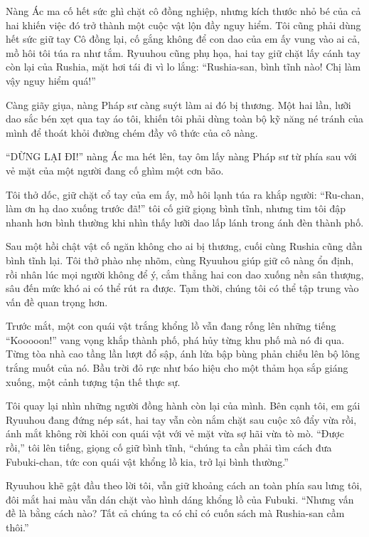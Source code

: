 \documentclass[../main.tex]{subfiles}
\begin{document}
Nàng Ác ma cố hết sức ghì chặt cô đồng nghiệp, nhưng kích thước nhỏ bé của cả hai khiến việc đó trở thành một cuộc vật lộn đầy nguy hiểm. Tôi cũng phải dùng hết sức giữ tay Cô đồng lại, cố gắng không để con dao của em ấy vung vào ai cả, mồ hôi tôi túa ra như tắm. Ryuuhou cũng phụ họa, hai tay giữ chặt lấy cánh tay còn lại của Rushia, mặt hơi tái đi vì lo lắng: ``Rushia-san, bình tĩnh nào! Chị làm vậy nguy hiểm quá!''

Càng giãy giụa, nàng Pháp sư càng suýt làm ai đó bị thương. Một hai lần, lưỡi dao sắc bén xẹt qua tay áo tôi, khiến tôi phải dùng toàn bộ kỹ năng né tránh của mình để thoát khỏi đường chém đầy vô thức của cô nàng.

``DỪNG LẠI ĐI!'' nàng Ác ma hét lên, tay ôm lấy nàng Pháp sư từ phía sau với vẻ mặt của một người đang cố ghìm một cơn bão.

Tôi thở dốc, giữ chặt cổ tay của em ấy, mồ hôi lạnh túa ra khắp người: ``Ru-chan, làm ơn hạ dao xuống trước đã!'' tôi cố giữ giọng bình tĩnh, nhưng tim tôi đập nhanh hơn bình thường khi nhìn thấy lưỡi dao lấp lánh trong ánh đèn thành phố.

\ct

Sau một hồi chật vật cố ngăn không cho ai bị thương, cuối cùng Rushia cũng dần bình tĩnh lại. Tôi thở phào nhẹ nhõm, cùng Ryuuhou giúp giữ cô nàng ổn định, rồi nhân lúc mọi người không để ý, cắm thẳng hai con dao xuống nền sân thượng, sâu đến mức khó ai có thể rút ra được. Tạm thời, chúng tôi có thể tập trung vào vấn đề quan trọng hơn.

Trước mắt, một con quái vật trắng khổng lồ vẫn đang rống lên những tiếng ``Kooooon!'' vang vọng khắp thành phố, phá hủy từng khu phố mà nó đi qua. Từng tòa nhà cao tầng lần lượt đổ sập, ánh lửa bập bùng phản chiếu lên bộ lông trắng muốt của nó. Bầu trời đỏ rực như báo hiệu cho một thảm họa sắp giáng xuống, một cảnh tượng tận thế thực sự.

Tôi quay lại nhìn những người đồng hành còn lại của mình. Bên cạnh tôi, em gái Ryuuhou đang đứng nép sát, hai tay vẫn còn nắm chặt sau cuộc xô đẩy vừa rồi, ánh mắt không rời khỏi con quái vật với vẻ mặt vừa sợ hãi vừa tò mò. ``Được rồi,'' tôi lên tiếng, giọng cố giữ bình tĩnh, ``chúng ta cần phải tìm cách đưa Fubuki-chan, tức con quái vật khổng lồ kia, trở lại bình thường.''

Ryuuhou khẽ gật đầu theo lời tôi, vẫn giữ khoảng cách an toàn phía sau lưng tôi, đôi mắt hai màu vẫn dán chặt vào hình dáng khổng lồ của Fubuki. ``Nhưng vấn đề là bằng cách nào? Tất cả chúng ta có chỉ có cuốn sách mà Rushia-san cầm thôi.''
\end{document}
